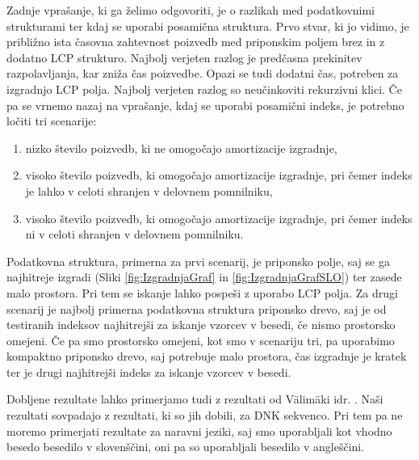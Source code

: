 Zadnje vprašanje, ki ga želimo odgovoriti, je o razlikah med podatkovnimi strukturami ter kdaj se uporabi posamična struktura. Prvo stvar, ki jo vidimo, je približno ista časovna zahtevnost poizvedb med priponskim poljem brez in z dodatno LCP strukturo. Najbolj verjeten razlog je predčasna prekinitev razpolavljanja, kar zniža čas poizvedbe. Opazi se tudi dodatni čas, potreben za izgradnjo LCP polja. Najbolj verjeten razlog so neučinkoviti rekurzivni klici. Če pa se vrnemo nazaj na vprašanje, kdaj se uporabi posamični indeks, je potrebno ločiti tri scenarije: 
\begin{enumerate}
        \item nizko število poizvedb, ki ne omogočajo amortizacije izgradnje,
        \item visoko število poizvedb, ki omogočajo amortizacije izgradnje, pri čemer indeks je lahko v celoti shranjen v delovnem pomnilniku,
        \item visoko število poizvedb, ki omogočajo amortizacije izgradnje, pri čemer indeks ni v celoti shranjen v delovnem pomnilniku.
\end{enumerate} 
Podatkovna struktura, primerna za prvi scenarij, je priponsko polje, saj se ga najhitreje izgradi (Sliki \ref{fig:IzgradnjaGraf} in \ref{fig:IzgradnjaGrafSLO}) ter zasede malo prostora. Pri tem se iskanje lahko pospeši z uporabo LCP polja. Za drugi scenarij je najbolj primerna podatkovna struktura priponsko drevo, saj je od testiranih indeksov najhitrejši za iskanje vzorcev v besedi, če nismo prostorsko omejeni. Če pa smo prostorsko omejeni, kot smo v scenariju tri, pa uporabimo kompaktno priponsko drevo, saj potrebuje malo prostora, čas izgradnje je kratek ter je drugi najhitrejši indeks za iskanje vzorcev v besedi.

Dobljene rezultate lahko primerjamo tudi z rezultati od Välimäki idr. \cite{Valimaki2007}. Naši rezultati sovpadajo z rezultati, ki so jih dobili, za DNK sekvenco. Pri tem pa ne moremo primerjati rezultate za naravni jeziki, saj smo uporabljali kot vhodno besedo besedilo v slovenščini, oni pa so uporabljali besedilo v angleščini.